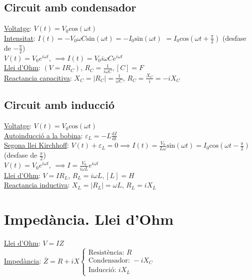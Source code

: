 \documentclass[12pt]{article}
\begin{document}
\begin{multicols}{5}
\subsection{Circuit amb condensador}

\underline{Voltatge}: $V(t) = V_0\text{cos}(\omega t)$ \\
\underline{Intensitat}: $I(t) = -V_0\omega C \text{sin}(\omega t) = -I_0\text{sin}(\omega t)$ $= I_0\text{cos}(\omega t + \frac{\pi}{2})$ (desfase de $-\frac{\pi}{2}$) \\
$V(t) = V_0 e^{i\omega t}$, $\implies I(t) = V_0i\omega Ce^{i\omega t}$ \\
\underline{Llei d'Ohm}: $(V=IR_C)$, $R_C = \frac{1}{i\omega C}, [C] = F$ \\
\underline{Reactancia capacitiva}: $X_C = \vert R_C\vert = \frac{1}{\omega C}$, $R_C = \frac{X_C}{i} = -iX_C$

\subsection{Circuit amb inducció}

\underline{Voltatge}: $V(t) = V_0\text{cos}(\omega t)$ \\
\underline{Autoinducció a la bobina}: $\varepsilon_L = -L \frac{\text{d}I}{\text{d}t}$ \\
\underline{Segona llei Kirchhoff}: $V(t) + \varepsilon_L = 0 \implies I(t) = \frac{V_0}{L\omega}\text{sin}(\omega t) = I_0\text{cos}(\omega t - \frac{\pi}{2})$ (desfase de $\frac{\pi}{2}$) \\
$V(t) = V_0e^{i\omega t}$, $\implies I = \frac{V_0}{i\omega L}e^{i\omega t}$ \\
\underline{Llei d'Ohm}: $V=IR_L$, $R_L=i\omega L, [L] = H$ \\
\underline{Reactancia inductiva}: $X_L = \vert R_L\vert = \omega L$, $R_L = iX_L$

\section{Impedància. Llei d'Ohm}

\underline{Llei d'Ohm}: $V = IZ$ \\
\underline{Impedància}: $\bar{Z} = R + iX \begin{cases} \text{Resistència: } R \\ \text{Condensador: } -iX_C \\ \text{Inducció: } iX_L \end{cases}$


\end{multicols}
\end{document}
